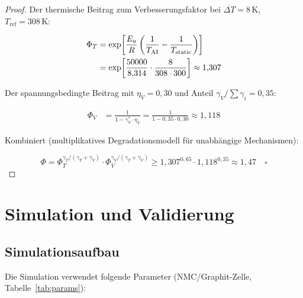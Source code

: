 ﻿\documentclass[12pt,a4paper]{article}
\begin{document}
	\begin{proof}
		Der thermische Beitrag zum Verbesserungsfaktor bei $\overline{\Delta T} = 8\,\mathrm{K}$,
		$T_\mathrm{ref} = 308\,\mathrm{K}$:
		
		\begin{align}
			\Phi_T &= \exp\!\left[\frac{E_a}{R}\left(\frac{1}{T_\mathrm{AI}} -
			\frac{1}{T_\mathrm{static}}\right)\right] \notag\\
			&= \exp\!\left[\frac{50000}{8{,}314}\cdot\frac{8}{308 \cdot 300}\right]
			\approx 1{,}307
		\end{align}
		
		Der spannungsbedingte Beitrag mit $\eta_V = 0{,}30$ und Anteil $\gamma_V / \sum \gamma_i = 0{,}35$:
		
		\begin{align}
			\Phi_V &= \frac{1}{1 - \gamma_V^* \cdot \eta_V}
			= \frac{1}{1 - 0{,}35 \cdot 0{,}30} \approx 1{,}118
		\end{align}
		
		Kombiniert (multiplikatives Degradationsmodell für unabhängige Mechanismen):
		
		\begin{equation}
			\Phi = \Phi_T^{\gamma_T/(\gamma_T+\gamma_V)} \cdot \Phi_V^{\gamma_V/(\gamma_T+\gamma_V)}
			\geq 1{,}307^{0{,}65} \cdot 1{,}118^{0{,}35} \approx 1{,}47 \quad \square
		\end{equation}
	\end{proof}
	
	\section{Simulation und Validierung}
	\label{sec:simulation}
	
	\subsection{Simulationsaufbau}
	
	Die Simulation verwendet folgende Parameter (NMC/Graphit-Zelle, Tabelle~\ref{tab:params}):
	
\end{document}
